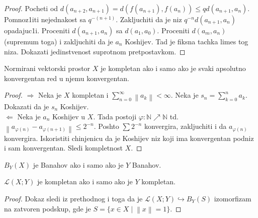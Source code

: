 \documentclass[a4paper,12pt]{article}
\newcommand{\NN}{\mathbb{N}}
\newcommand{\norm}[1]{\left\lVert#1\right\rVert}
\begin{document}
\begin{proof}
Pocheti od $d(a_{n+2}, a_{n+1}) = d(f(a_{n+1}), f(a_n)) \leq q d(a_{n+1}, a_n)$. Pomnoz1iti nejednakost sa $q^{-(n+1)}$. Zakljuchiti da je niz $q^{-n} d(a_{n+1}, a_n)$ opadajuc1i. Proceniti $d(a_{n+1}, a_n)$ sa $d(a_1, a_0)$. Proceniti $d(a_m, a_n)$ (supremum toga) i zakljuchiti da je $a_n$ Koshijev. Tad je fiksna tachka limes tog niza. Dokazati jedinstvenost suprotnom pretpostavkom.
\end{proof}

\begin{tma}
Normirani vektorski prostor $X$ je kompletan ako i samo ako je svaki apsolutno konvergentan red u njemu konvergentan.
\end{tma}
\begin{proof}
$\boxed{\Rightarrow}$ Neka je $X$ kompletan i $\sum_{n=0}^{\infty} \norm{a_k}<\infty$. Neka je $s_n = \sum_{k=0}^n a_k$. Dokazati da je $s_n$ Koshijev. \\
$\boxed{\Leftarrow}$ Neka je $a_n$ Koshijev u $X$. Tada postoji $\varphi: \NN \nearrow \NN$ td. $\norm{a_{\varphi(n)} - a_{\varphi(n+1)}} \leq 2^{-n}$. Poshto $\sum 2^{-n}$ konvergira, zakljuchiti i da $a_{\varphi(n)}$ konvergira. Iskoristiti chinjenicu da je Koshijev niz koji ima konvergentan podniz i sam konvergentan. Sledi kompletnost $X$.
\end{proof}

\begin{tma}
$B_Y(X)$ je Banahov ako i samo ako je $Y$ Banahov.
\end{tma}

\begin{posl}
$\mathcal{L}(X;Y)$ je kompletan ako i samo ako je $Y$ kompletan.
\end{posl}

\begin{proof}
Dokaz sledi iz prethodnog i toga da je $\mathcal{L}(X;Y)\hookrightarrow B_Y(S)$ izomorfizam na zatvoren podskup,  gde je $S = \{x \in X \mid \norm{x} = 1 \}$.
\end{proof}
\end{document}
